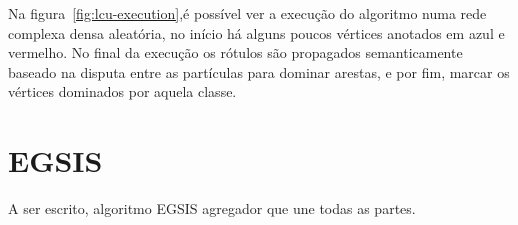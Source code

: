 Na figura~\ref{fig:lcu-execution},é possível ver a execução do
algoritmo numa rede complexa densa aleatória, no início há alguns
poucos vértices anotados em azul e vermelho. No final da execução os
rótulos são propagados semanticamente baseado na disputa entre as
partículas para dominar arestas, e por fim, marcar os vértices
dominados por aquela classe.


\section{EGSIS}\label{sec:teorica-egsis}

A ser escrito, algoritmo \gls{EGSIS} agregador que une todas as partes.
